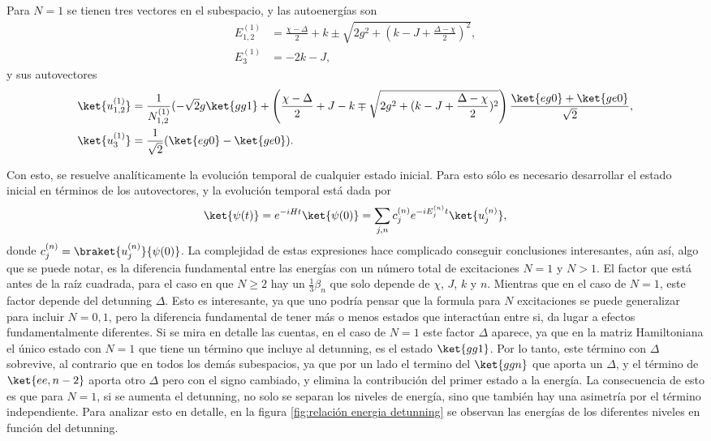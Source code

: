 Para $N=1$ se tienen tres vectores en el subespacio, y las autoenergías son
\begin{align}\label{ec4:energias n1}
    E_{1,2}^{(1)} &=\frac{\chi -\Delta}{2} +k \pm \sqrt{2g^2+(k-J+\frac{\Delta -\chi}{2} )^2},\\
    E_3^{(1)} & = -2k-J,  
\end{align}
y sus autovectores
\begin{equation}
    \begin{aligned}
        \ket{u_{1,2}^{(1)}}&=\frac{1}{N_{1,2}^{(1)}}(-\sqrt{2}g\ket{gg1}+ \left(\frac{\chi-\Delta}{2}+J-k \mp \sqrt{2g^2+(k-J+\frac{\Delta -\chi}{2} )^2} \right)\dfrac{\ket{eg0}+\ket{ge0}}{\sqrt{2}},\\
        \ket{u_3^{(1)}}&= \frac{1}{\sqrt{2}}(\ket{eg0}-\ket{ge0}).
    \end{aligned}
\end{equation}

Con esto, se resuelve analíticamente la evolución temporal de cualquier estado inicial.
Para esto sólo es necesario desarrollar el estado inicial en términos de los autovectores, y la evolución temporal está dada por
\begin{equation}
\ket{\psi(t)}=e^{-iHt}\ket{\psi(0)}=\sum_{j,n} c_j^{(n)}e^{-iE_j^{(n)}t}\ket{u_j^{(n)}},
\end{equation}
donde $c_j^{(n)}=\braket{u_j^{(n)}}{\psi(0)}$.
La complejidad de estas expresiones hace complicado conseguir conclusiones interesantes, aún así, algo que se puede notar, es la diferencia fundamental entre las energías con un número total de excitaciones $N=1$ y $N>1$. El factor que está antes de la raíz cuadrada, para el caso en que $N \geq 2$ hay un $\frac{1}{3}\beta_n$ que solo depende de $\chi$, $J$, $k$ y $n$. Mientras que en el caso de $N=1$, este factor depende del detunning $\Delta$. Esto es interesante, ya que uno podría pensar que la formula para $N$ excitaciones se puede generalizar para incluir $N=0,1$, pero la diferencia fundamental de tener más o menos estados que interactúan entre si, da lugar a efectos fundamentalmente diferentes. Si se mira en detalle las cuentas, en el caso de $N=1$ este factor $\Delta$ aparece, ya que en la matriz Hamiltoniana el único estado con $N=1$ que tiene un término que incluye al detunning, es el estado $\ket{gg1}$. Por lo tanto, este término con $\Delta$ sobrevive, al contrario que en todos los demás subespacios, ya que por un lado el termino del $\ket{ggn}$ que aporta un $\Delta$, y el término de $\ket{ee,n-2}$ aporta otro $\Delta$ pero con el signo cambiado, y elimina la contribución del primer estado a la energía. La consecuencia de esto es que para $N=1$, si se aumenta el detunning, no solo se separan los niveles de energía, sino que también hay una asimetría por el término independiente. Para analizar esto en detalle, en la figura \ref{fig:relación energia detunning} se observan las energías de los diferentes niveles en función del detunning. 

